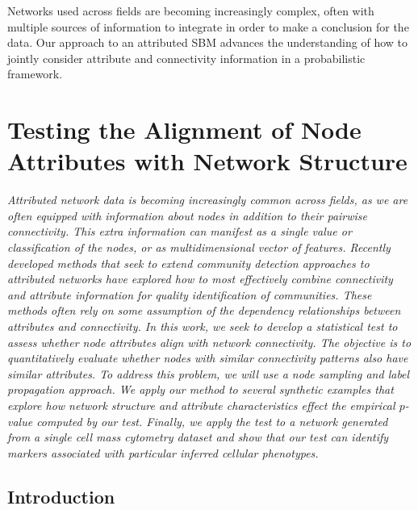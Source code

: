 Networks used across fields are becoming increasingly complex, often with multiple sources of information to integrate in order to make a conclusion for the data. Our approach to an attributed SBM advances the understanding of how to jointly consider attribute and connectivity information in a probabilistic framework. 

\chapter{Testing the Alignment of Node Attributes with Network Structure}

\emph{Attributed network data is becoming increasingly common across fields, as we are often equipped with information about nodes in addition to their pairwise connectivity. This extra information can manifest as a single value or classification of the nodes, or as multidimensional vector of features. Recently developed methods that seek to extend community detection approaches to attributed networks have explored how to most effectively combine connectivity and attribute information for quality identification of communities. These methods often rely on some assumption of the dependency relationships between attributes and connectivity. In this work, we seek to develop a statistical test to assess whether node attributes align with network connectivity. The objective is to quantitatively evaluate whether nodes with similar connectivity patterns also have similar attributes. To address this problem, we will use a node sampling and label propagation approach. We apply our method to several synthetic examples that explore how network structure and attribute characteristics effect the empirical $p$-value computed by our test. Finally, we apply the test to a network generated from a single cell mass cytometry dataset and show that our test can identify markers associated with particular inferred cellular phenotypes. }

\section{Introduction}


